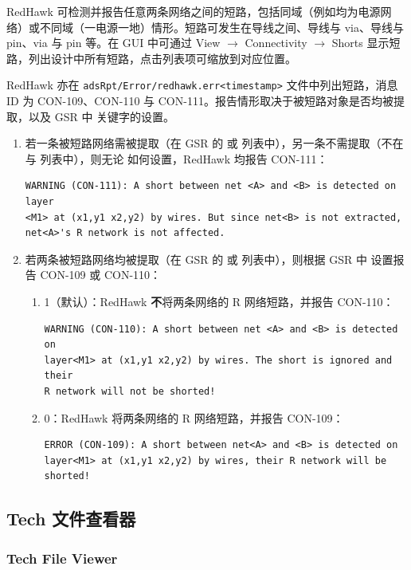 RedHawk 可检测并报告任意两条网络之间的短路，包括同域（例如均为电源网络）或不同域（一电源一地）情形。短路可发生在导线之间、导线与 via、导线与 pin、via 与 pin 等。在 GUI 中可通过 View $\rightarrow$ Connectivity $\rightarrow$ Shorts 显示短路，列出设计中所有短路，点击列表项可缩放到对应位置。

RedHawk 亦在 \texttt{adsRpt/Error/redhawk.err<timestamp>} 文件中列出短路，消息 ID 为 CON-109、CON-110 与 CON-111。报告情形取决于被短路对象是否均被提取，以及 GSR 中  关键字的设置。

\begin{enumerate}
  \item 若一条被短路网络需被提取（在 GSR 的  或  列表中），另一条不需提取（不在  与  列表中），则无论  如何设置，RedHawk 均报告 CON-111：
\begin{lstlisting}
WARNING (CON-111): A short between net <A> and <B> is detected on layer
<M1> at (x1,y1 x2,y2) by wires. But since net<B> is not extracted,
net<A>'s R network is not affected.
\end{lstlisting}
  \item 若两条被短路网络均被提取（在 GSR 的  或  列表中），则根据 GSR 中  设置报告 CON-109 或 CON-110：
  \begin{enumerate}
    \item {} 1（默认）：RedHawk \textbf{不}将两条网络的 R 网络短路，并报告 CON-110：
\begin{lstlisting}
WARNING (CON-110): A short between net <A> and <B> is detected on
layer<M1> at (x1,y1 x2,y2) by wires. The short is ignored and their
R network will not be shorted!
\end{lstlisting}
    \item {} 0：RedHawk 将两条网络的 R 网络短路，并报告 CON-109：
\begin{lstlisting}
ERROR (CON-109): A short between net<A> and <B> is detected on
layer<M1> at (x1,y1 x2,y2) by wires, their R network will be shorted!
\end{lstlisting}
  \end{enumerate}
\end{enumerate}

\subsection{Tech 文件查看器}
\subsubsection*{Tech File Viewer}

